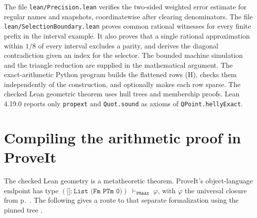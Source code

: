 \documentclass[11pt,letterpaper]{article}
\newcommand{\key}[1]{\smallskip\noindent{\sffamily\bfseries\color{ink}#1}\enspace}
\theoremstyle{packet}\newtheorem{theorem}{Theorem}\newtheorem{lem}[theorem]{Lemma}
\newcommand{\head}[1]{\section{#1}}
\begin{document}
\key{Further checked results.} The file \texttt{lean/Precision.lean} verifies the two-sided weighted error estimate for regular names and snapshots, coordinatewise after clearing denominators. The file \texttt{lean/SelectionBoundary.lean} proves common rational witnesses for every finite prefix in the interval example. It also proves that a single rational approximation within $1/8$ of every interval excludes a parity, and derives the diagonal contradiction given an index for the selector. The bounded machine simulation and the triangle reduction are supplied in the mathematical argument. The exact-arithmetic Python program builds the flattened rows (H), checks them independently of the construction, and optionally makes each row sparse. The checked Lean geometric theorem uses hull trees and membership proofs. Lean 4.19.0 reports only \texttt{propext} and \texttt{Quot.sound} as axioms of \texttt{QPoint.hellyExact}.

\newpage
\head{Compiling the arithmetic proof in ProveIt}

The checked Lean geometry is a metatheoretic theorem. ProveIt's object-language endpoint has type \( (\texttt{[]} : \texttt{List (Fm PTm 0)})\;\vdash_{\texttt{PRAAx}}\;\varphi \), with $\varphi$ the universal closure from p.~\pageref{sec:codes}. The following gives a route to that separate formalization using the pinned tree \cite{proveit}.
\end{document}
